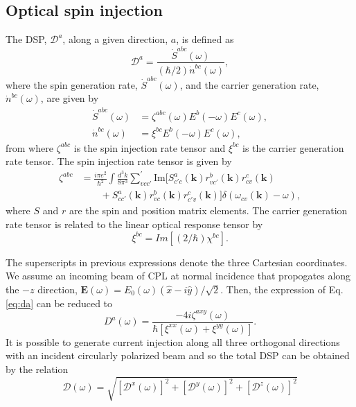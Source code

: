\documentclass[pss]{wiley2sp} %
\begin{document}
\subsection{Optical spin injection}\label{sec:theory-DSP}

The DSP, $\mathcal{D}^{a}$, along a given direction, $a$, is defined as
\begin{equation}\label{eq:da}
\mathcal{D}^{a}=\frac{\dot{S}^{abc}(\omega)}{(\hbar/2)\dot{n}^{bc}(\omega)},
\end{equation}
where the spin generation rate, $\dot{S}^{abc}(\omega)$, and the carrier generation rate, $\dot{n}^{bc}(\omega)$,  are given by 
\begin{align*}
\dot{S}^{abc}(\omega) &= \zeta^{abc}(\omega)E^{b}(-\omega)E^{c}(\omega), \nonumber \\ 
\dot{n}^{bc}(\omega)  &= \xi^{bc}E^{b}(-\omega)E^{c}(\omega),
\end{align*}
from where $\zeta^{abc}$ is the spin injection rate tensor and $\xi^{bc}$ is the carrier generation rate tensor. The spin injection rate tensor is given by
\begin{align*}\label{eq:zeta}
\zeta^{abc} &= \frac{i\pi e^{2}}{\hbar^{2}}\int\frac{d^{3}k}{8\pi^{3}}
\sum_{vcc'}^{\prime}\text{Im}\bigl[S^{a}_{c'c}(\textbf{k})
r^{b}_{vc'}(\textbf{k})r^{c}_{cv}(\textbf{k})\nonumber\\
&\qquad+S^{a}_{cc'}(\textbf{k})
r^{b}_{vc}(\textbf{k})r^{c}_{c'v}(\textbf{k})\bigr]
\delta(\omega_{cv}(\textbf{k})-\omega),
\end{align*}
where $S$ and $r$ are the spin and position matrix elements. The carrier generation rate tensor is related to the linear optical response tensor by 
\begin{equation*}
\xi^{bc}=Im[(2/\hbar)\chi^{bc}].
\end{equation*}

The superscripts in previous expressions denote the three Cartesian coordinates. We assume an incoming beam of CPL at normal incidence that propogates along the $-z$ direction, $\mathbf{E}(\omega) = E_{0}(\omega)(\hat{x} - i\hat{y})/\sqrt{2}$. Then, the expression of Eq. \eqref{eq:da} can be reduced to
\begin{equation}\label{eq:D^i}
D^{a}(\omega) = 
\frac{-4i\zeta^{axy}(\omega)}
    {\hbar\left[\xi^{xx}(\omega) + \xi^{yy}(\omega)\right]}.
\end{equation}
It is possible to generate current injection along all three orthogonal directions with
an incident circularly polarized beam and so the total DSP can be obtained by the relation
\begin{equation}\label{eq:dsptotal}
\mathcal{D}(\omega) = \sqrt{ [\mathcal{D}^{x}(\omega)]^{2} + [\mathcal{D}^{y}(\omega)]^{2} +[\mathcal{D}^{z}(\omega)]^{2}  }
\end{equation}
\end{document}
